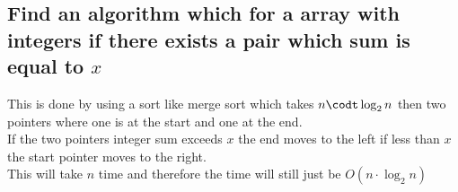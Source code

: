 \documentclass[12pt, a4paper]{article}
\begin{document}
			\subsection{Find an algorithm which for a array with integers if there exists a pair which sum is equal to $x$}
				This is done by using a sort like merge sort which takes $n\codt \log_2n$ then two pointers where one is at the start and one at the end.\\
				If the two pointers integer sum exceeds $x$ the end moves to the left if less than $x$ the start pointer moves to the right.\\
				This will take $n$ time and therefore the time will still just be $O(n\cdot \log_2n)$
				
\end{document}
